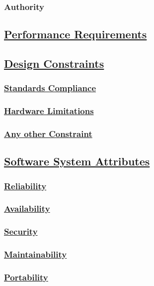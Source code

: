 	\subsubsection{Authority}
	
	
\subsection[Performance Requirements]{\hyperlink{toc}{Performance Requirements}}

\subsection[Design Constraints]{\hyperlink{toc}{Design Constraints}}
	\subsubsection[Standards Compliance]{\hyperlink{toc}{Standards Compliance}}
	\subsubsection[Hardware Limitations]{\hyperlink{toc}{Hardware Limitations}}
	\subsubsection[Any other Constraint]{\hyperlink{toc}{Any other Constraint}}

\subsection[Software System Attributes]{\hyperlink{toc}{Software System Attributes}}
	\subsubsection[Reliability]{\hyperlink{toc}{Reliability}}
	\subsubsection[Availability]{\hyperlink{toc}{Availability}}
	\subsubsection[Security]{\hyperlink{toc}{Security}}
	\subsubsection[Maintainability]{\hyperlink{toc}{Maintainability}}
	\subsubsection[Portability]{\hyperlink{toc}{Portability}}
